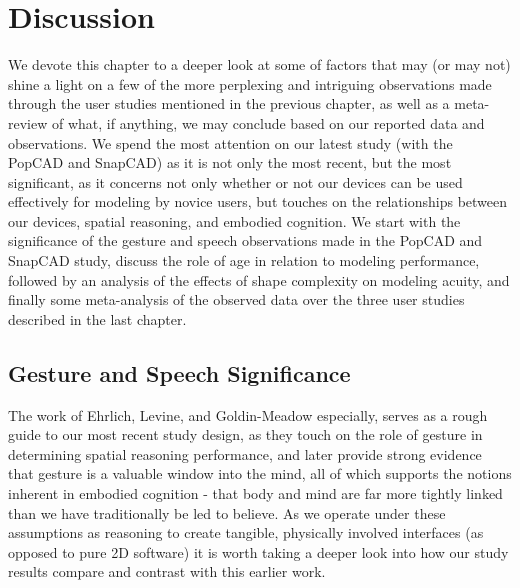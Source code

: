 \chapter{Discussion}
\label{discussion}

We devote this chapter to a deeper look at some of factors that may (or may not)
shine a light on a few of the more perplexing and intriguing observations made
through the user studies mentioned in the previous chapter, as well as a
meta-review of what, if anything, we may conclude based on our reported data and
observations. We spend the most attention on our latest study (with the PopCAD
and SnapCAD) as it is not only the most recent, but the most significant, as it
concerns not only whether or not our devices can be used effectively for
modeling by novice users, but touches on the relationships between our devices,
spatial reasoning, and embodied cognition. We start with the significance of the
gesture and speech observations made in the PopCAD and SnapCAD study, discuss
the role of age in relation to modeling performance, followed by an analysis of
the effects of shape complexity on modeling acuity, and finally some
meta-analysis of the observed data over the three user studies described in the
last chapter.


\section{Gesture and Speech Significance}

The work of Ehrlich\cite{ehrlich2006importance}, Levine\cite{levine1999early},
and Goldin-Meadow especially\cite{goldin}\cite{goldin2005hearing}, serves as a
rough guide to our most recent study design, as they touch on the role of
gesture in determining spatial reasoning performance, and later provide strong
evidence that gesture is a valuable window into the mind, all of which supports
the notions inherent in embodied cognition - that body and mind are far more
tightly linked than we have traditionally be led to believe. As we operate under
these assumptions as reasoning to create tangible, physically involved
interfaces (as opposed to pure 2D software) it is worth taking a deeper look
into how our study results compare and contrast with this earlier work.


